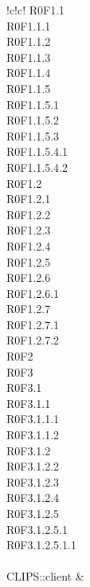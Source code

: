 \begin{tabella}{!{\VRule}c!{\VRule}c!{\VRule}}
{					R0F1.1 \\
					R0F1.1.1 \\
					R0F1.1.2 \\
					R0F1.1.3 \\
					R0F1.1.4 \\
					R0F1.1.5 \\ 
					R0F1.1.5.1 \\
					R0F1.1.5.2 \\
					R0F1.1.5.3 \\
					R0F1.1.5.4.1 \\
					R0F1.1.5.4.2 \\
					R0F1.2 \\
					R0F1.2.1 \\
					R0F1.2.2 \\
					R0F1.2.3 \\
					R0F1.2.4 \\ 
					R0F1.2.5 \\
					R0F1.2.6 \\
					R0F1.2.6.1 \\
					R0F1.2.7 \\
					R0F1.2.7.1 \\ 
					R0F1.2.7.2 \\
					R0F2 \\
					R0F3 \\
					R0F3.1 \\
					R0F3.1.1 \\
					R0F3.1.1.1 \\
					R0F3.1.1.2 \\
					R0F3.1.2 \\
					R0F3.1.2.2 \\
					R0F3.1.2.3 \\
					R0F3.1.2.4 \\
					R0F3.1.2.5 \\
					R0F3.1.2.5.1 \\
					R0F3.1.2.5.1.1 \\
					
				} \\
				
	CLIPS::client & \cellacaporiga{
					
}
\end{tabella}
